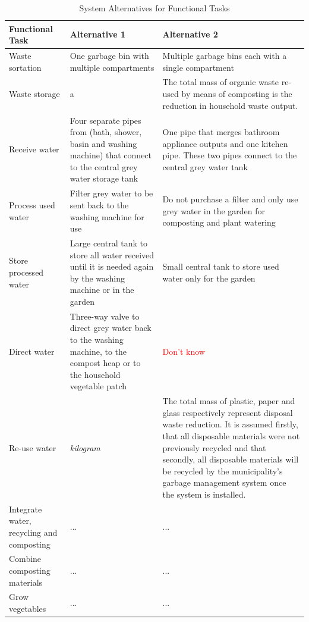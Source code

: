 \documentclass[a4paper,11pt,fleqn]{report}
\begin{document}
%
\begin{table}[h!]
\caption {System Alternatives for Functional Tasks} \label{tb: Performance_Metrics} 
\begin{center}
\begin{tabular}{p{3.5cm}|p{6cm}|p{6cm}}\toprule
	{\textbf{Functional Task}} & {\textbf{Alternative 1}} & {\textbf{Alternative 2}}\\ \midrule
    Waste sortation & One garbage bin with multiple compartments & Multiple garbage bins each with a single compartment\\
    \hline
    Waste storage & a &The total mass of organic waste re-used by means of composting is the reduction in household waste output.\\
    \hline
    Receive water & Four separate pipes from (bath, shower, basin and washing machine) that connect to the central grey water storage tank & One pipe that merges bathroom appliance outputs and one kitchen pipe. These two pipes connect to the central grey water tank\\
    \hline
    Process used water & Filter grey water to be sent back to the washing machine for use & Do not purchase a filter and only use grey water in the garden for composting and plant watering\\
    \hline
    Store processed water & Large central tank to store all water received until it is needed again by the washing machine or in the garden & Small central tank to store used water only for the garden\\
    \hline
    Direct water & Three-way valve to direct grey water back to the washing machine, to the compost heap or to the household vegetable patch & \textcolor{red}{Don't know}\\
    \hline
    Re-use water & \textit{kilogram} & The total mass of plastic, paper and glass respectively represent disposal waste reduction. It is assumed firstly, that all disposable materials were not previously recycled and that secondly, all disposable materials will be recycled by the municipality's garbage management system once the system is installed.\\
    \hline
    Integrate water, recycling and composting & ... & ...\\
    \hline
     Combine composting materials & ... & ...\\
    \hline
     Grow vegetables & ...& ...\\
    \hline
    \bottomrule
\end{tabular}
\end{center}
\end{table}
%
\end{document}
